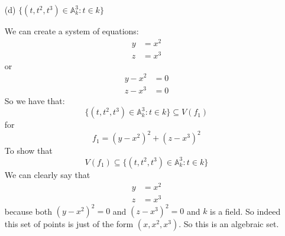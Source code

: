 \documentclass{article}
\begin{document}
\begin{itemize}
        \item [(d)] $\{(t, t^{2}, t^{3}) \in \mathbb{A}^{3}_{k}: t \in k\}$
            \begin{answer}
                We can create a system of equations:
                    \begin{align*}
                        y &= x^{2} \\
                        z &= x^{3}   
                    \end{align*}
                or 
                    \begin{align*}
                        y - x^{2} &= 0 \\
                        z - x^{3} &= 0   
                    \end{align*}
                So we have that:
                    \begin{equation*}
                        \{(t, t^{2}, t^{3}) \in \mathbb{A}^{3}_{k}: t \in k\} \subseteq V(f_{1})
                    \end{equation*}
                for
                    \begin{equation*}
                        f_{1} = (y - x^{2})^{2} + (z - x^{3})^{2}
                    \end{equation*}
                To show that 
                    \begin{equation*}
                        V(f_{1}) \subseteq \{(t, t^{2}, t^{3}) \in \mathbb{A}^{3}_{k}: t \in k\}
                   \end{equation*}
                We can clearly say that
                    \begin{align*}
                        y &= x^{2} \\
                        z &= x^{3}   
                    \end{align*}
                because both $(y - x^{2})^{2} = 0$ and $(z - x^{3})^{2} = 0$ and $k$ is a field. So indeed this set of points is just of the form $(x, x^{2}, x^{3})$. So this is an algebraic set.
            \end{answer}
    \end{itemize}
\end{document}
